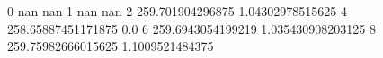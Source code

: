 0 nan nan
1 nan nan
2 259.701904296875 1.04302978515625
4 258.65887451171875 0.0
6 259.6943054199219 1.035430908203125
8 259.75982666015625 1.1009521484375
